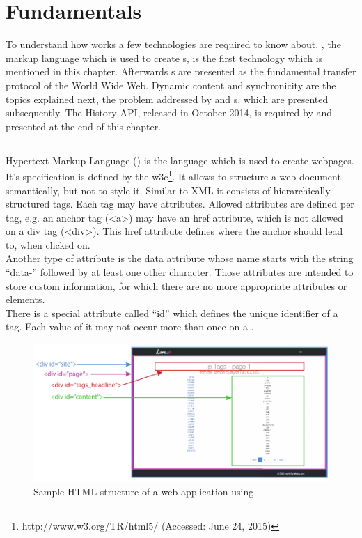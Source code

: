 \section{Fundamentals\label{chap:fundamentals}}

To understand how \lare{} works a few technologies are required to know about.
\html{}, the markup language which is used to create \webPage{}s, is the first technology which is mentioned in this chapter.
Afterwards \httpRequest{}s are presented as the fundamental transfer protocol of the World Wide Web.
Dynamic content and synchronicity are the topics explained next, the problem addressed by \ajax{} and \singlePageApplication{}s, which are presented subsequently.
The History API, released in October 2014, is required by \lare{} and presented at the end of this chapter.

\subsection{\html{}\label{html}}
Hypertext Markup Language (\html{}) is the language which is used to create webpages.
It's specification is defined by the \gls{w3c}\footnote{http://www.w3.org/TR/html5/ (Accessed: June 24, 2015)}.
It allows to structure a web document semantically, but not to style it.
Similar to XML it consists of hierarchically structured tags.
Each tag may have attributes.
Allowed attributes are defined per tag, e.g. an anchor tag (<a>) may have an href attribute, which is not allowed on a div tag (<div>).
This href attribute defines where the anchor should lead to, when clicked on.
\\
Another type of attribute is the data attribute whose name starts with the string \enquote{data-} followed by at least one other character.
Those attributes are intended to store custom information, for which there are no more appropriate attributes or elements.
\\
There is a special attribute called \enquote{id} which defines the unique identifier of a tag.
Each value of it may not occur more than once on a \webPage{}.

\begin{figure}[H]
\centering
\includegraphics[width=13cm]{images/lare_html.pdf}
\caption[lare_html]{Sample HTML structure of a web application using \lare{}}
\label{fig:lare_html}
\end{figure}

